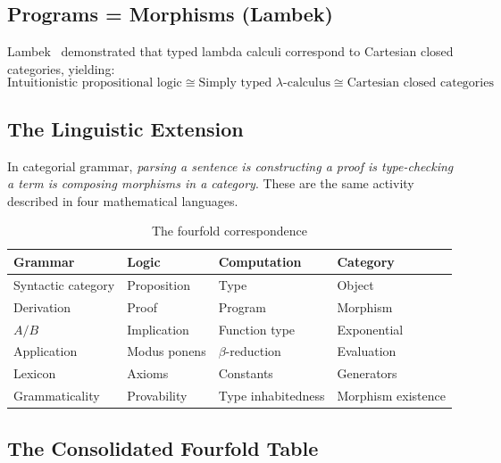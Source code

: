 \documentclass[12pt,a4paper]{article}
\begin{document}
\subsection{Programs = Morphisms (Lambek)}

Lambek~\cite{Lambek1972,Lambek1980} demonstrated that typed lambda calculi
correspond to Cartesian closed categories, yielding:
\[
\text{Intuitionistic propositional logic}
  \cong \text{Simply typed }\lambda\text{-calculus}
  \cong \text{Cartesian closed categories}
\]

\subsection{The Linguistic Extension}

In categorial grammar, \emph{parsing a sentence is constructing a proof is
type-checking a term is composing morphisms in a category}. These are the same
activity described in four mathematical languages.

\begin{table}[ht]
\centering
\caption{The fourfold correspondence}
\label{tab:fourfold}
\begin{tabular}{@{}llll@{}}
\toprule
Grammar & Logic & Computation & Category \\
\midrule
Syntactic category & Proposition & Type & Object \\
Derivation & Proof & Program & Morphism \\
$A/B$ & Implication & Function type & Exponential \\
Application & Modus ponens & $\beta$-reduction & Evaluation \\
Lexicon & Axioms & Constants & Generators \\
Grammaticality & Provability & Type inhabitedness & Morphism existence \\
\bottomrule
\end{tabular}
\end{table}

\subsection{The Consolidated Fourfold Table}
\end{document}
